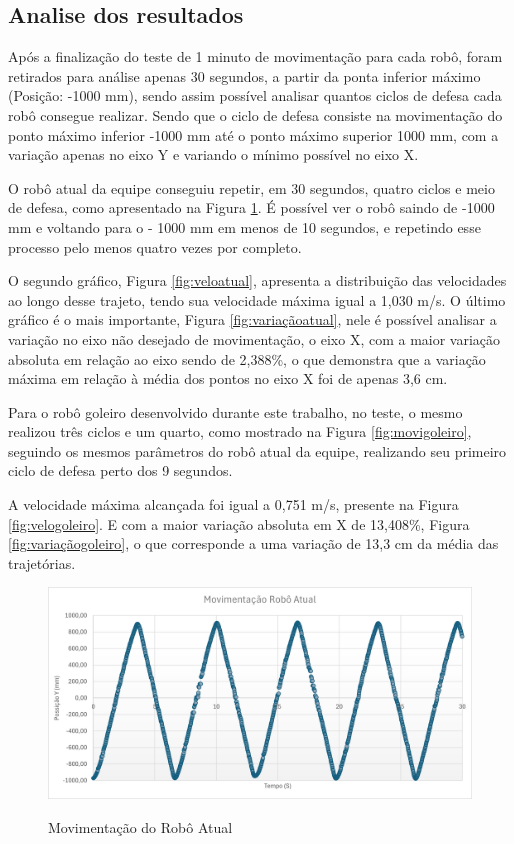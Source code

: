 \documentclass[deposito, acronym, symbols]{fei}
\begin{document}
\subsection{Analise dos resultados}

Após a finalização do teste de 1 minuto de movimentação para cada robô, foram retirados para análise apenas 30 segundos, a partir da ponta inferior máximo (Posição: -1000 mm), sendo assim possível analisar quantos ciclos de defesa cada robô consegue realizar. Sendo que o ciclo de defesa consiste na movimentação do ponto máximo inferior -1000 mm até o ponto máximo superior 1000 mm, com a variação apenas no eixo Y e variando o mínimo possível no eixo X.

O robô atual da equipe conseguiu repetir, em 30 segundos, quatro ciclos e meio de defesa, como apresentado na Figura \ref{fig:moviatual}. É possível ver o robô saindo de -1000 mm e voltando para o - 1000 mm em menos de 10 segundos, e repetindo esse processo pelo menos quatro vezes por completo.

O segundo gráfico, Figura \ref{fig:veloatual}, apresenta a distribuição das velocidades ao longo desse trajeto, tendo sua velocidade máxima igual a 1,030 m/s. O último gráfico é o mais importante, Figura \ref{fig:variaçãoatual}, nele é possível analisar a variação no eixo não desejado de movimentação, o eixo X, com a maior variação absoluta em relação ao eixo sendo de 2,388\%, o que demonstra que a variação máxima em relação à média dos pontos no eixo X foi de apenas 3,6 cm.

Para o robô goleiro desenvolvido durante este trabalho, no teste, o mesmo realizou três ciclos e um quarto, como mostrado na Figura \ref{fig:movigoleiro}, seguindo os mesmos parâmetros do robô atual da equipe, realizando seu primeiro ciclo de defesa perto dos 9 segundos.

A velocidade máxima alcançada foi igual a 0,751 m/s, presente na  Figura \ref{fig:velogoleiro}. E com a maior variação absoluta em X de 13,408\%, Figura \ref{fig:variaçãogoleiro}, o que corresponde a uma variação de 13,3 cm da média das trajetórias.


\begin{figure}[!htb]
    \centering
    \caption{Movimentação do Robô Atual}
    \includegraphics[scale=0.6]{Imagens/Resultados finais/Movimentação Robô atual.png}
    \label{fig:moviatual}
\end{figure}
\end{document}
